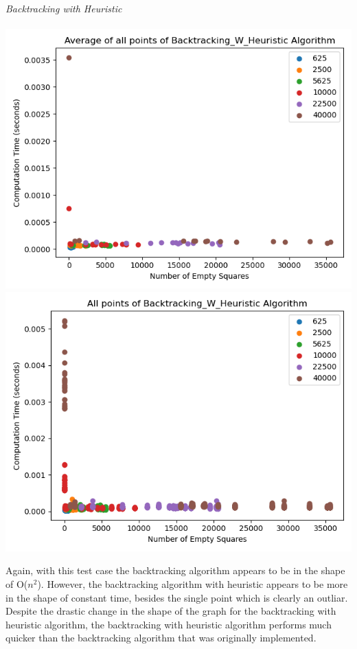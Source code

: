 \documentclass{article}
\begin{document}
\noindent \textit{Backtracking with Heuristic} \\ \\
\includegraphics[scale=0.5]{scatter_avg_Backtracking_w_Heuristic-2.png}
\includegraphics[scale=0.5]{scatter_Backtracking_w_Heuristic-2.png}

Again, with this test case the backtracking algorithm appears to be in the shape of O($n^2$).
However, the backtracking algorithm with heuristic appears to be more in the shape of constant
time, besides the single point which is clearly an outliar. Despite the drastic change in the 
shape of the graph for the backtracking with heuristic algorithm, the backtracking with heuristic algorithm
performs much quicker than the backtracking algorithm that was originally implemented.
\end{document}
